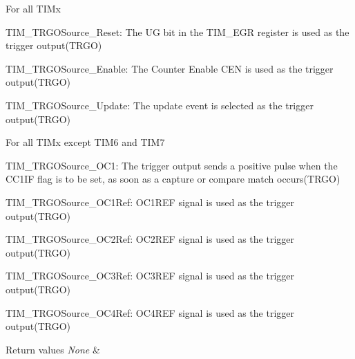 \begin{DoxyItemize}
\item For all T\+I\+Mx \begin{DoxyItemize}
\item T\+I\+M\+\_\+\+T\+R\+G\+O\+Source\+\_\+\+Reset\+: The UG bit in the T\+I\+M\+\_\+\+E\+GR register is used as the trigger output(\+T\+R\+G\+O) \item T\+I\+M\+\_\+\+T\+R\+G\+O\+Source\+\_\+\+Enable\+: The Counter Enable C\+EN is used as the trigger output(\+T\+R\+G\+O) \item T\+I\+M\+\_\+\+T\+R\+G\+O\+Source\+\_\+\+Update\+: The update event is selected as the trigger output(\+T\+R\+G\+O)\end{DoxyItemize}

\item For all T\+I\+Mx except T\+I\+M6 and T\+I\+M7 \begin{DoxyItemize}
\item T\+I\+M\+\_\+\+T\+R\+G\+O\+Source\+\_\+\+O\+C1\+: The trigger output sends a positive pulse when the C\+C1\+IF flag is to be set, as soon as a capture or compare match occurs(\+T\+R\+G\+O) \item T\+I\+M\+\_\+\+T\+R\+G\+O\+Source\+\_\+\+O\+C1\+Ref\+: O\+C1\+R\+EF signal is used as the trigger output(\+T\+R\+G\+O) \item T\+I\+M\+\_\+\+T\+R\+G\+O\+Source\+\_\+\+O\+C2\+Ref\+: O\+C2\+R\+EF signal is used as the trigger output(\+T\+R\+G\+O) \item T\+I\+M\+\_\+\+T\+R\+G\+O\+Source\+\_\+\+O\+C3\+Ref\+: O\+C3\+R\+EF signal is used as the trigger output(\+T\+R\+G\+O) \item T\+I\+M\+\_\+\+T\+R\+G\+O\+Source\+\_\+\+O\+C4\+Ref\+: O\+C4\+R\+EF signal is used as the trigger output(\+T\+R\+G\+O)\end{DoxyItemize}

\begin{DoxyRetVals}{Return values}
{\em None} & \\
\hline
\end{DoxyRetVals}

\end{DoxyItemize}
